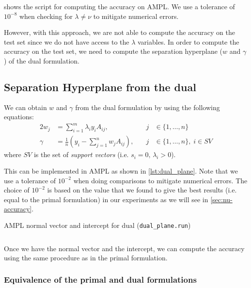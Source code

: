  shows the script for computing the accuracy
on AMPL. We use a tolerance of $10^{-8}$ when checking for
$\lambda \neq \nu$ to mitigate numerical errors.

However, with this approach, we are not able to compute the
accuracy on the test set since we do not have access to the
$\lambda$ variables. In order to compute the accuracy on the
test set, we need to compute the separation hyperplane ($w$ and $\gamma$)
of the dual formulation.

\subsection{Separation Hyperplane from the dual}%

We can obtain $w$ and $\gamma$ from the dual formulation
by using the following equations:
\begin{alignat*}{2}
    w_j &= \sum_{i=1}^m \lambda_i y_i A_{ij},&\quad j &\in \{1,\ldots,n\} \\
    \gamma &= \frac{1}{n}\left(y_i - \sum_{j=1}^{n} w_j A_{ij}\right),&\quad j &\in \{1,\ldots,n\},\;i \in SV
\end{alignat*}
where $SV$ is the set of \emph{support vectors} (i.e. $s_i = 0,\, \lambda_i > 0$).

This can be implemented in AMPL as shown in \cref{lst:dual_plane}. Note
that we use a tolerance of $10^{-2}$ when doing comparisons to mitigate
numerical errors. The choice of $10^{-2}$ is based on the value that
we found to give the best results (i.e. equal to the primal formulation)
in our experiments as we will see in \cref{sec:nu-accuracy}.
\begin{listing}[H]
	\caption{AMPL normal vector and intercept for dual (\texttt{dual\_plane.run})}
    \label{lst:dual_plane}
    \inputminted{ampl}{../ampl/dual_plane.run}
\end{listing}

Once we have the normal vector and the intercept, we can
compute the accuracy using the same procedure as in
the primal formulation.

\subsubsection{Equivalence of the primal and dual formulations}%

